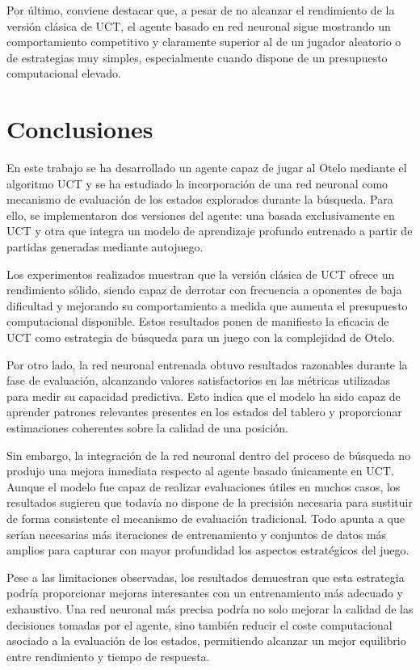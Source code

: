 \documentclass[conference,a4paper]{IEEEtran}
\begin{document}
Por último, conviene destacar que, a pesar de no alcanzar el rendimiento de la versión clásica de UCT, el agente basado en red neuronal sigue mostrando un comportamiento competitivo y claramente superior al de un jugador aleatorio o de estrategias muy simples, especialmente cuando dispone de un presupuesto computacional elevado. 

\section{Conclusiones} 

En este trabajo se ha desarrollado un agente capaz de jugar al Otelo mediante el algoritmo UCT y se ha estudiado la incorporación de una red neuronal como mecanismo de evaluación de los estados explorados durante la búsqueda. 
Para ello, se implementaron dos versiones del agente: una basada exclusivamente en UCT y otra que integra un modelo de aprendizaje profundo entrenado a partir de partidas generadas mediante autojuego. 

Los experimentos realizados muestran que la versión clásica de UCT ofrece un rendimiento sólido, siendo capaz de derrotar con frecuencia a oponentes de baja dificultad y mejorando su comportamiento a medida que aumenta el presupuesto computacional disponible. 
Estos resultados ponen de manifiesto la eficacia de UCT como estrategia de búsqueda para un juego con la complejidad de Otelo. 

Por otro lado, la red neuronal entrenada obtuvo resultados razonables durante la fase de evaluación, alcanzando valores satisfactorios en las métricas utilizadas para medir su capacidad predictiva. 
Esto indica que el modelo ha sido capaz de aprender patrones relevantes presentes en los estados del tablero y proporcionar estimaciones coherentes sobre la calidad de una posición. 

Sin embargo, la integración de la red neuronal dentro del proceso de búsqueda no produjo una mejora inmediata respecto al agente basado únicamente en UCT. 
Aunque el modelo fue capaz de realizar evaluaciones útiles en muchos casos, los resultados sugieren que todavía no dispone de la precisión necesaria para sustituir de forma consistente el mecanismo de evaluación tradicional. 
Todo apunta a que serían necesarias más iteraciones de entrenamiento y conjuntos de datos más amplios para capturar con mayor profundidad los aspectos estratégicos del juego. 

Pese a las limitaciones observadas, los resultados demuestran que esta estrategia podría proporcionar mejoras interesantes con un entrenamiento más adecuado y exhaustivo. 
Una red neuronal más precisa podría no solo mejorar la calidad de las decisiones tomadas por el agente, sino también reducir el coste computacional asociado a la evaluación de los estados, permitiendo alcanzar un mejor equilibrio entre rendimiento y tiempo de respuesta. 
\end{document}
